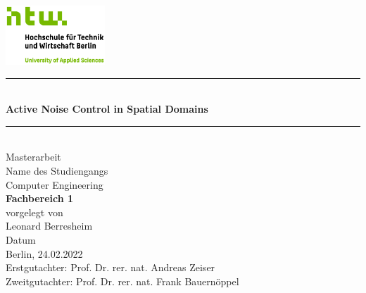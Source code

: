 \begin{titlepage}

    \begin{center}
        \includegraphics[width=0.28\textwidth,keepaspectratio]{images/htw_logo.jpg}
        \vspace{0.3cm}
        \par\noindent\rule{\textwidth}{0.4pt}
        \\
        \vspace{0.7cm}
        \LARGE
        {\color{htwgreen}
        \textbf{Active Noise Control in Spatial Domains}
        }
        \par\noindent\rule{\textwidth}{0.4pt}
        \\
        \Large
        \vspace{0.3cm}
        Masterarbeit
        \\
        \vspace{2cm}
        \small
        Name des Studiengangs
        \vspace{0.4cm}
        \\
        \Large
        Computer Engineering
        \vspace{0.4cm}
        \\
        {\color{htwgreen}
        \textbf{Fachbereich 1}
        }
        \vspace{0.4cm}
        \\
        \small
        vorgelegt von
        \vspace{0.4cm}
        \\
        \Large
        Leonard Berresheim
        \\
        \vspace{4cm}
        \small
        Datum
        \vspace{0.4cm}
        \\
        \normalsize
        Berlin, 24.02.2022
        \vspace{1.4cm}
        \\
        \Large
        Erstgutachter: Prof. Dr. rer. nat. Andreas Zeiser\\
        \vspace{0.4cm}
        Zweitgutachter: Prof. Dr. rer. nat. Frank Bauernöppel\\
        
        \vfill
    \end{center}
\end{titlepage}